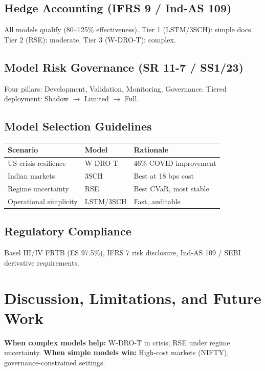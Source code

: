 \documentclass[11pt]{article}
\begin{document}
\subsection{Hedge Accounting (IFRS 9 / Ind-AS 109)}
All models qualify (80--125\% effectiveness). Tier 1 (LSTM/3SCH): simple docs. Tier 2 (RSE): moderate. Tier 3 (W-DRO-T): complex.

\subsection{Model Risk Governance (SR 11-7 / SS1/23)}
Four pillars: Development, Validation, Monitoring, Governance. Tiered deployment: Shadow $\to$ Limited $\to$ Full.

\subsection{Model Selection Guidelines}
\begin{table}[H]\centering\small
\begin{tabular}{@{}lll@{}}
\toprule
\textbf{Scenario} & \textbf{Model} & \textbf{Rationale} \\\midrule
US crisis resilience & W-DRO-T & 46\% COVID improvement \\
Indian markets & 3SCH & Best at 18 bps cost \\
Regime uncertainty & RSE & Best CVaR, most stable \\
Operational simplicity & LSTM/3SCH & Fast, auditable \\
\bottomrule
\end{tabular}
\end{table}

\subsection{Regulatory Compliance}
Basel III/IV FRTB (ES 97.5\%), IFRS 7 risk disclosure, Ind-AS 109 / SEBI derivative requirements.

\section{Discussion, Limitations, and Future Work}

\textbf{When complex models help:} W-DRO-T in crisis; RSE under regime uncertainty.
\textbf{When simple models win:} High-cost markets (NIFTY), governance-constrained settings.
\end{document}
